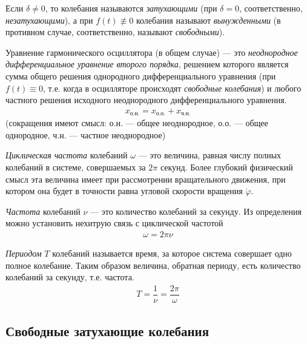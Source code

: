 \documentclass[a4paper, usenames, dvipsnames]{article}
\begin{document}
Если $\delta \not= 0$, то колебания называются {\it затухающими}
(при $\delta = 0$, соответственно, {\it незатухающими}),
а при $f(t) \not\equiv 0$ колебания называют {\it вынужденными}
(в противном случае, соответственно, называют {\it свободными}).

Уравнение гармонического осциллятора (в общем случае) --- это
{\it неоднородное дифференциальное уравнение второго порядка},
решением которого является сумма общего
решения однородного дифференциального уравнения (при $f(t) \equiv 0$,
т.е. когда в осцилляторе происходят {\it свободные колебания})
и любого частного решения исходного неоднородного дифференциального уравнения.
\begin{gather*}
    x_\text{о.н.} = x_\text{о.о.} + x_\text{ч.н.}
\end{gather*}
(сокращения имеют смысл: о.н. --- общее неоднородное, о.о. --- общее однородное,
ч.н. --- частное неоднородное)

{\it Циклическая частота} колебаний $\omega$ --- это величина,
равная числу полных колебаний в системе,
совершаемых за $2\pi$ секунд.
Более глубокий физический смысл эта величина имеет при рассмотрении вращательного движения,
при котором она будет в точности равна угловой скорости вращения $\dot{\varphi}$.

    {\it Частота} колебаний $\nu$ --- это количество колебаний за секунду.
Из определения можно установить нехитрую связь с циклической частотой
\begin{gather*}
    \omega = 2\pi\nu
\end{gather*}

{\it Периодом} $T$ колебаний называется время, за которое система совершает одно полное колебание.
Таким образом величина, обратная периоду, есть количество колебаний за секунду,
т.е. частота.
\begin{gather*}
    T = \dfrac{1}{\nu} = \dfrac{2\pi}{\omega}
\end{gather*}

\subsection*{Свободные затухающие колебания}
\end{document}
